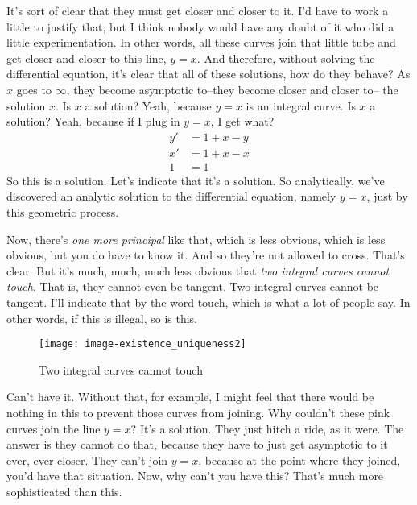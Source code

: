 It's sort of clear that they must get closer and closer to it.
I'd have to work a little to justify that, but I think nobody would have any doubt of it who
did a little experimentation.
In other words, all these curves join that little tube
and get closer and closer to this line, $y = x$.
And therefore, without solving the differential equation,
it's clear that all of these solutions, how do they behave?
As $x$ goes to $\infty$, they become asymptotic to--they become closer and closer to--
the solution $x$.
Is $x$ a solution?
Yeah, because $y = x$ is an integral curve.
Is $x$ a solution?
Yeah, because if I plug in $y = x$, I get what?
\begin{align*}
  y' &= 1 + x - y \\
  x' & = 1 + x - x \\
  1 & = 1  
\end{align*}
So this is a solution.
Let's indicate that it's a solution. 
So analytically, we've discovered an analytic solution
to the differential equation, namely $y = x$, just by this geometric process. 

\clearpage

Now, there's \emph{one more principal} like that,
which is less obvious, which is less obvious, but you do have to know it.
And so they're not allowed to cross. That's clear.
But it's much, much, much less obvious that \emph{two integral curves cannot touch}.
That is, they cannot even be tangent. Two integral curves cannot be tangent.
I'll indicate that by the word touch, which is what a lot of people say.
In other words, if this is illegal, so is this.

\begin{wrapfigure}{r}{5.5cm}
  \texttt{[image: image-existence\_uniqueness2]}
  \caption{Two integral curves cannot touch}
\end{wrapfigure}

Can't have it.
Without that, for example, I might feel that there would be nothing in this to prevent
those curves from joining.
Why couldn't these pink curves join the line $y  = x$?
It's a solution.
They just hitch a ride, as it were.
The answer is they cannot do that, because they have to just get asymptotic to it ever,
ever closer.
They can't join $y = x$, because at the point where they joined, you'd have that situation.
Now, why can't you have this?
That's much more sophisticated than this.\\

